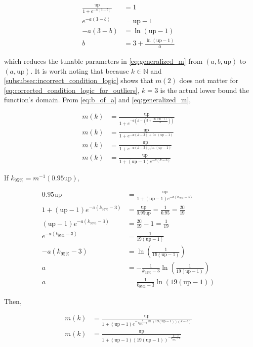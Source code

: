 \begin{align}
    \frac{\text{up}}{1 + e^{-a(3-b)}} &= 1 \\
    e^{-a(3-b)} &= \text{up} - 1 \\
    -a(3-b) &= \ln(\text{up} - 1) \\
    b &= 3 + \frac{\ln(\text{up} - 1)}{a} \label{eq:b_of_a}
\end{align}

which reduces the tunable parameters in \cref{eq:generalized_m} from $(a, b, \text{up})$ to $(a, \text{up})$. It is worth noting that because $k \in \mathbb{N}$ and \cref{subsubsec:incorrect_condition_logic} shows that $m(2)$ does not matter for \cref{eq:corrected_condition_logic_for_outliers}, $k = 3$ is the actual lower bound the function's domain. From \cref{eq:b_of_a} and \cref{eq:generalized_m},

\begin{align}
    m(k) &= \frac{\text{up}}{1 + e^{-a(k-(3 + \frac{\ln(\text{up} - 1)}{a}))}} \\
    m(k) &= \frac{\text{up}}{1 + e^{-a(k-3) + \ln(\text{up} - 1)}} \\
    m(k) &= \frac{\text{up}}{1 + e^{-a(k-3)}e^{\ln(\text{up} - 1)}} \\
    m(k) &= \frac{\text{up}}{1 + (\text{up} - 1)e^{-a(k-3)}}
\end{align}

If $k_{95\%} = m^{-1}(0.95\text{up})$,

\begin{align}
    0.95\text{up} &= \frac{\text{up}}{1+(\text{up}-1)e^{-a(k_{95\%}-3)}} \\
    1 + (\text{up}-1)e^{-a(k_{95\%}-3)} &= \frac{\text{up}}{0.95\text{up}} = \frac{1}{0.95} = \frac{20}{19} \\
    (\text{up}-1)e^{-a(k_{95\%}-3)} &= \frac{20}{19} - 1 = \frac{1}{19} \\
    e^{-a(k_{95\%}-3)} &= \frac{1}{19(\text{up}-1)} \\
    -a(k_{95\%}-3) &= \ln\left(\frac{1}{19(\text{up}-1)}\right) \\
    a &= -\frac{1}{k_{95\%}-3}\ln\left(\frac{1}{19(\text{up}-1)}\right) \\
    a &= \frac{1}{k_{95\%}-3}\ln(19(\text{up}-1))
\end{align}

Then,

\begin{align}
    m(k) &= \frac{\text{up}}{1 + (\text{up} - 1)e^{-\frac{1}{k_{95\%}-3}\ln(19(\text{up}-1))(k-3)}} \\
    m(k) &= \frac{\text{up}}{1 + (\text{up} - 1)(19(\text{up}-1))^{-\frac{k-3}{k_{95\%}-3}}}
\end{align}

